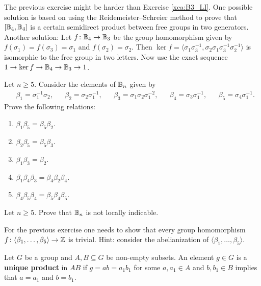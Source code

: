 The previous exercise might be harder than Exercise \ref{xca:B3_LI}. One possible solution
is based on using the Reidemeister--Schreier method to prove that 
$[\mathbb{B}_4,\mathbb{B}_4]$ is a certain semidirect product 
between free groups in two generators. Another solution: Let 
$f\colon\mathbb{B}_4\to\mathbb{B}_3$ be the group homomorphism given by $f(\sigma_1)=f(\sigma_3)=\sigma_1$ 
and $f(\sigma_2)=\sigma_2$. Then $\ker f=\langle \sigma_1\sigma_3^{-1},\sigma_2\sigma_1\sigma_3^{-1}\sigma_2^{-1}\rangle$ 
is isomorphic to the free group in two letters. Now use the exact sequence
$1\to \ker f\to\mathbb{B}_4\to\mathbb{B}_3\to1$. 

\begin{exercise}
\label{xca:relations}
    Let $n\geq5$. Consider the elements of $\mathbb{B}_n$ given by 
    \begin{align*}
        &\beta_1=\sigma_1^{-1}\sigma_2,
        &&\beta_2=\sigma_2\sigma_1^{-1}, 
        &&\beta_3=\sigma_1\sigma_2\sigma_1^{-2},
        &&\beta_4=\sigma_3\sigma_1^{-1}, 
        &&\beta_5=\sigma_4\sigma_1^{-1}.
    \end{align*}
    Prove the following relations:
    \begin{enumerate}
        \item $\beta_1\beta_5=\beta_5\beta_2$.
        \item $\beta_2\beta_5=\beta_5\beta_3$.
        \item $\beta_1\beta_3=\beta_2$.
        \item $\beta_1\beta_4\beta_3=\beta_4\beta_2\beta_4$.
        \item $\beta_4\beta_5\beta_4=\beta_5\beta_4\beta_5$.
    \end{enumerate}
\end{exercise}

\begin{exercise}
    Let $n\geq 5$. 
    Prove that $\mathbb{B}_n$ is not locally indicable.
\end{exercise}

For the previous exercise one needs to show that
every group homomorphism $f\colon \langle\beta_1,\dots,\beta_5\rangle\to\mathbb{Z}$ is trivial. Hint: consider
the abelianization of $\langle\beta_1,\dots,\beta_5\rangle$. 


Let $G$ be a group and $A,B\subseteq G$ be non-empty subsets. 
An element $g\in G$ is a \textbf{unique product} in $AB$ if $g=ab=a_1b_1$ for some
$a,a_1\in
A$ and $b,b_1\in B$ implies that $a=a_1$ and $b=b_1$.

